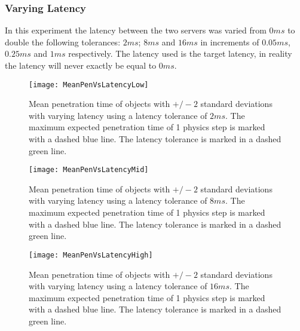 %
%

\subsubsection{Varying Latency}

In this experiment the latency between the two servers was varied from $0ms$ to double the following tolerances: $2ms$; $8ms$ and $16ms$ in increments of $0.05ms$, $0.25ms$ and $1ms$ respectively. The latency used is the target latency, in reality the latency will never exactly be equal to $0ms$.

\begin{figure}[t]
	\centering
	\texttt{[image: MeanPenVsLatencyLow]}
	\caption{Mean penetration time of objects with $+/-2$ standard deviations with varying latency using a latency tolerance of $2ms$. The maximum expected penetration time of 1 physics step is marked with a dashed blue line. The latency tolerance is marked in a dashed green line.}
	\label{fig_CollisionsPenVsLatencyLow}
\end{figure}
\begin{figure}[t]
	\centering
	\texttt{[image: MeanPenVsLatencyMid]}
	\caption{Mean penetration time of objects with $+/-2$ standard deviations with varying latency using a latency tolerance of $8ms$. The maximum expected penetration time of 1 physics step is marked with a dashed blue line. The latency tolerance is marked in a dashed green line.}
	\label{fig_CollisionsPenVsLatencyMid}
\end{figure}
\begin{figure}[t]
	\centering
	\texttt{[image: MeanPenVsLatencyHigh]}
	\caption{Mean penetration time of objects with $+/-2$ standard deviations with varying latency using a latency tolerance of $16ms$. The maximum expected penetration time of 1 physics step is marked with a dashed blue line. The latency tolerance is marked in a dashed green line.}
	\label{fig_CollisionsPenVsLatencyHigh}
\end{figure}

